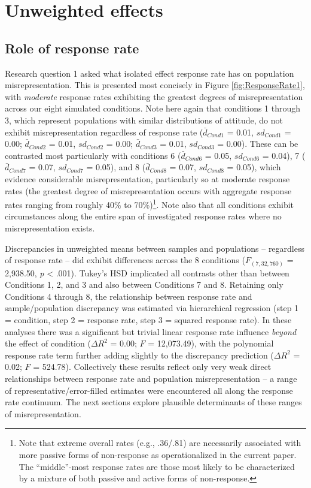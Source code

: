 \documentclass[
  man,mask]{apa7}
\begin{document}
\section{Unweighted effects}\label{unweighted-effects}

\subsection{Role of response rate}\label{role-of-response-rate}

Research question 1 asked what isolated effect response rate has on population misrepresentation. This is presented most concisely in Figure \ref{fig:ResponseRate1}, with \emph{moderate} response rates exhibiting the greatest degrees of misrepresentation across our eight simulated conditions. Note here again that conditions 1 through 3, which represent populations with similar distributions of attitude, do not exhibit misrepresentation regardless of response rate (\(\bar{d}_{Cond1}\) = 0.01, \(sd_{Cond1}\) = 0.00; \(\bar{d}_{Cond2}\) = 0.01, \(sd_{Cond2}\) = 0.00; \(\bar{d}_{Cond3}\) = 0.01, \(sd_{Cond3}\) = 0.00). These can be contrasted most particularly with conditions 6 (\(\bar{d}_{Cond6}\) = 0.05, \(sd_{Cond6}\) = 0.04), 7 (\(\bar{d}_{Cond7}\) = 0.07, \(sd_{Cond7}\) = 0.05), and 8 (\(\bar{d}_{Cond8}\) = 0.07, \(sd_{Cond8}\) = 0.05), which evidence considerable misrepresentation, particularly so at moderate response rates (the greatest degree of misrepresentation occurs with aggregate response rates ranging from roughly 40\% to 70\%)\footnote{Note that extreme overall rates (e.g., .36/.81) are necessarily associated with more passive forms of non-response as operationalized in the current paper. The ``middle''-most response rates are those most likely to be characterized by a mixture of both passive and active forms of non-response.}. Note also that all conditions exhibit circumstances along the entire span of investigated response rates where no misrepresentation exists.

Discrepancies in unweighted means between samples and populations -- regardless of response rate -- did exhibit differences across the 8 conditions (\(F_{(7,32,760)}\) = 2,938.50, \emph{p} \textless{} .001). Tukey's HSD implicated all contrasts other than between Conditions 1, 2, and 3 and also between Conditions 7 and 8. Retaining only Conditions 4 through 8, the relationship between response rate and sample/population discrepancy was estimated via hierarchical regression (step 1 = condition, step 2 = response rate, step 3 = squared response rate). In these analyses there was a significant but trivial linear response rate influence \emph{beyond} the effect of condition (\(\Delta{R^2}\) = 0.00; \(F\) = 12,073.49), with the polynomial response rate term further adding slightly to the discrepancy prediction (\(\Delta{R^2}\) = 0.02; \(F\) = 524.78). Collectively these results reflect only very weak direct relationships between response rate and population misrepresentation -- a range of representative/error-filled estimates were encountered all along the response rate continuum. The next sections explore plausible determinants of these ranges of misrepresentation.
\end{document}
